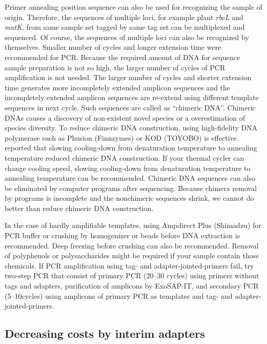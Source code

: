 \documentclass[titlepage,10pt,a4paper,english]{jsbook}
\begin{document}
Primer annealing position sequence can also be used for recognizing the sample of origin. Therefore, the sequences of multiple loci, for example plant \textit{rbcL} and \textit{matK}, from same sample set tagged by same tag set can be multiplexed and sequenced. Of course, the sequences of multiple loci can also be recognized by themselves. Smaller number of cycles and longer extension time were recommended for PCR. Because the required amount of DNA for sequence sample preparation is not so high, the larger number of cycles of PCR amplification is not needed. The larger number of cycles and shorter extension time generates more incompletely extended amplicon sequences and the incompletely extended amplicon sequences are re-extend using different template sequences in next cycle. Such sequences are called as ``chimeric DNA''. Chimeric DNAs causes a discovery of non-existent novel species or a overestimation of species diversity. To reduce chimeric DNA construction, using high-fidelity DNA polymerase such as Phusion (Finnzymes) or KOD (TOYOBO) is effective. \citet{Stevens2013} reported that slowing cooling-down from denaturation temperature to annealing temperature reduced chimeric DNA construction. If your thermal cycler can change cooling speed, slowing cooling-down from denaturation temperature to annealing temperature can be recommended. Chimeric DNA sequences can also be eliminated by computer programs after sequencing. Because chimera removal by programs is incomplete and the nonchimeric sequences shrink, we cannot do better than reduce chimeric DNA construction.

In the case of hardly amplifiable templates, using Ampdirect Plus (Shimadzu) for PCR buffer or crushing by homogenizer or beads before DNA extraction is recommended. Deep freezing before crushing can also be recommended. Removal of polyphenols or polysaccharides might be required if your sample contain those chemicals. If PCR amplification using tag- and adapter-jointed-primers fail, try two-step PCR that consist of primary PCR (20--30 cycles) using primers without tags and adapters, purification of amplicons by ExoSAP-IT, and secondary PCR (5--10cycles) using amplicons of primary PCR as templates and tag- and adapter-jointed-primers.

\subsection{Decreasing costs by interim adapters}
\end{document}
